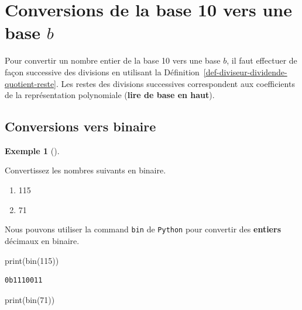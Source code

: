 \documentclass[
  letterpaper,
]{scrbook}
\newenvironment{Shaded}{}{}
\newcommand{\BuiltInTok}[1]{#1}
\newcommand{\DecValTok}[1]{\textcolor[rgb]{0.25,0.63,0.44}{#1}}
\newcommand{\NormalTok}[1]{#1}
\providecommand{\tightlist}{%
  \setlength{\itemsep}{0pt}\setlength{\parskip}{0pt}}\usepackage{longtable,booktabs,array}
\theoremstyle{definition}
\newtheorem{example}{Exemple}[chapter]
\theoremstyle{definition}
\theoremstyle{plain}
\theoremstyle{remark}
\begin{document}
\hypertarget{conversions-de-la-base-10-vers-une-base-b}{%
\section{\texorpdfstring{Conversions de la base 10 vers une base
\(b\)}{Conversions de la base 10 vers une base b}}\label{conversions-de-la-base-10-vers-une-base-b}}

Pour convertir un nombre entier de la base 10 vers une base \(b\), il
faut effectuer de façon successive des divisions en utilisant la
Définition~\ref{def-diviseur-dividende-quotient-reste}. Les restes des
divisions successives correspondent aux coefficients de la
représentation polynomiale (\textbf{lire de base en haut}).

\hypertarget{conversions-vers-binaire}{%
\subsection{Conversions vers binaire}\label{conversions-vers-binaire}}

\leavevmode{}%
\begin{example}[]\label{exm-conversion-vers-binaire}

Convertissez les nombres suivants en binaire.

\begin{enumerate}
\def\labelenumi{\alph{enumi})}
\tightlist
\item
  115
\item
  71
\end{enumerate}

\end{example}

Nous pouvons utiliser la command \texttt{bin} de \texttt{Python} pour
convertir des \textbf{entiers} décimaux en binaire.

\begin{Shaded}
\begin{Highlighting}[]
\BuiltInTok{print}\NormalTok{(}\BuiltInTok{bin}\NormalTok{(}\DecValTok{115}\NormalTok{))}
\end{Highlighting}
\end{Shaded}

\begin{verbatim}
0b1110011
\end{verbatim}

\begin{Shaded}
\begin{Highlighting}[]
\BuiltInTok{print}\NormalTok{(}\BuiltInTok{bin}\NormalTok{(}\DecValTok{71}\NormalTok{))}
\end{Highlighting}
\end{Shaded}
\end{document}
